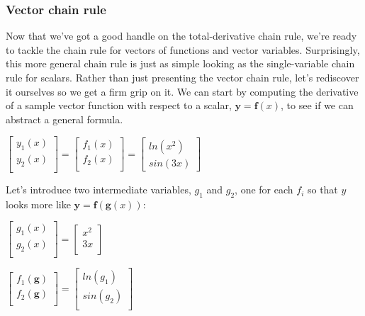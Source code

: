 \documentclass[11pt]{article}
\begin{document}
\subsubsection{Vector chain rule}

Now that we've got a good handle on the total-derivative chain rule, we're ready to tackle the chain rule for vectors of functions and vector variables. Surprisingly, this more general chain rule is just as simple looking as the single-variable chain rule for scalars. Rather than just presenting the vector chain rule, let's rediscover it ourselves so we get a firm grip on it. We can start by computing the derivative of a sample vector function with respect to a scalar, $\mathbf{y} = \mathbf{f}(x)$, to see if we can abstract a general formula.   

$
\begin{bmatrix}
	y_1(x)\\
	y_2(x)\\
\end{bmatrix} =
\begin{bmatrix}
	f_1(x)\\
	f_2(x)\\
\end{bmatrix} = 
\begin{bmatrix}
	ln(x^2)\\
	sin(3x)
\end{bmatrix}
$

Let's introduce two intermediate variables, $g_1$ and $g_2$, one for each $f_i$ so that $y$ looks more like $\mathbf{y} = \mathbf{f}(\mathbf{g}(x))$:

$
\begin{bmatrix}
	g_1(x)\\
	g_2(x)\\
\end{bmatrix} = \begin{bmatrix}
	x^2\\
	3x\\
\end{bmatrix}
$

$
\begin{bmatrix}
	f_1(\mathbf{g})\\
	f_2(\mathbf{g})\\
\end{bmatrix} = \begin{bmatrix}
	ln(g_1)\\
	sin(g_2)\\
\end{bmatrix}
$
\end{document}
